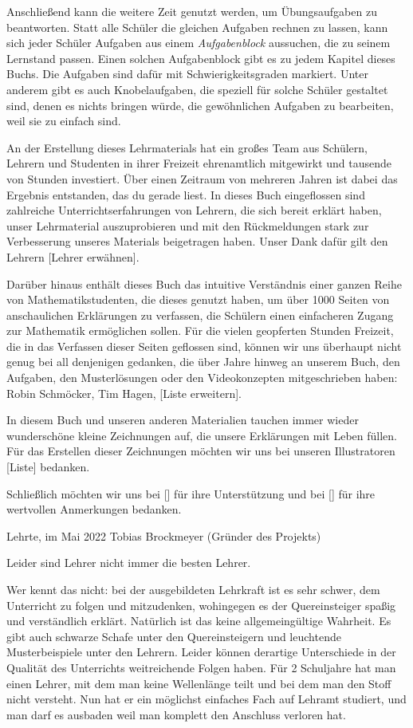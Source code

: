 \documentclass[../main.tex]{subfiles}
\begin{document}
Anschließend kann die weitere Zeit genutzt werden, um Übungsaufgaben zu beantworten. Statt alle Schüler die gleichen Aufgaben rechnen zu lassen, kann sich jeder Schüler Aufgaben aus einem \emph{Aufgabenblock} aussuchen, die zu seinem Lernstand passen. Einen solchen Aufgabenblock gibt es zu jedem Kapitel dieses Buchs. Die Aufgaben sind dafür mit Schwierigkeitsgraden markiert. Unter anderem gibt es auch Knobelaufgaben, die speziell für solche Schüler gestaltet sind, denen es nichts bringen würde, die gewöhnlichen Aufgaben zu bearbeiten, weil sie zu einfach sind.

An der Erstellung dieses Lehrmaterials hat ein großes Team aus Schülern, Lehrern und Studenten in ihrer Freizeit ehrenamtlich mitgewirkt und tausende von Stunden investiert. Über einen Zeitraum von mehreren Jahren ist dabei das Ergebnis entstanden, das du gerade liest. 
In dieses Buch eingeflossen sind zahlreiche Unterrichtserfahrungen von Lehrern, die sich bereit erklärt haben, unser Lehrmaterial auszuprobieren und mit den Rückmeldungen stark zur Verbesserung unseres Materials beigetragen haben. Unser Dank dafür gilt den Lehrern [Lehrer erwähnen].

Darüber hinaus enthält dieses Buch das intuitive Verständnis einer ganzen Reihe von Mathematikstudenten, die dieses genutzt haben, um über 1000 Seiten von anschaulichen Erklärungen zu verfassen, die Schülern einen einfacheren Zugang zur Mathematik ermöglichen sollen. 
Für die vielen geopferten Stunden Freizeit, die in das Verfassen dieser Seiten geflossen sind, können wir uns überhaupt nicht genug bei all denjenigen gedanken, die über Jahre hinweg an unserem Buch, den Aufgaben, den Musterlösungen oder den Videokonzepten mitgeschrieben haben: Robin Schmöcker, Tim Hagen, [Liste erweitern].

In diesem Buch und unseren anderen Materialien tauchen immer wieder wunderschöne kleine Zeichnungen auf, die unsere Erklärungen mit Leben füllen. Für das Erstellen dieser Zeichnungen möchten wir uns bei unseren Illustratoren [Liste] bedanken.

Schließlich möchten wir uns bei [] für ihre Unterstützung und bei [] für ihre wertvollen Anmerkungen bedanken.

Lehrte, im Mai 2022 \hfill Tobias Brockmeyer (Gründer des Projekts)

Leider sind Lehrer nicht immer die besten Lehrer.

Wer kennt das nicht: bei der ausgebildeten Lehrkraft ist es sehr schwer, dem Unterricht zu folgen und mitzudenken, wohingegen es der Quereinsteiger spaßig und verständlich erklärt. Natürlich ist das keine allgemeingültige Wahrheit. Es gibt auch schwarze Schafe unter den Quereinsteigern und leuchtende Musterbeispiele unter den Lehrern. Leider können derartige Unterschiede in der Qualität des Unterrichts weitreichende Folgen haben. Für 2 Schuljahre hat man einen Lehrer, mit dem man keine Wellenlänge teilt und bei dem man den Stoff nicht versteht. Nun hat er ein möglichst einfaches Fach auf Lehramt studiert, und man darf es ausbaden weil man komplett den Anschluss verloren hat.
\end{document}
